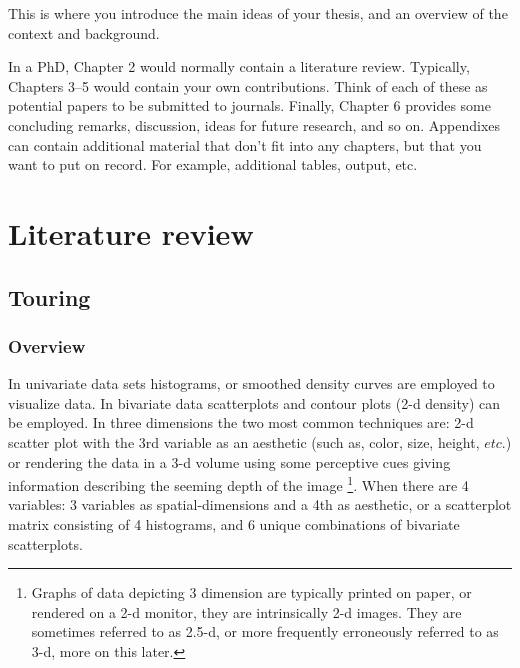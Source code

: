\documentclass{monashthesis}
\begin{document}
This is where you introduce the main ideas of your thesis, and an
overview of the context and background.

In a PhD, Chapter 2 would normally contain a literature review.
Typically, Chapters 3--5 would contain your own contributions. Think of
each of these as potential papers to be submitted to journals. Finally,
Chapter 6 provides some concluding remarks, discussion, ideas for future
research, and so on. Appendixes can contain additional material that
don't fit into any chapters, but that you want to put on record. For
example, additional tables, output, etc.

\chapter{Literature review}\label{ch:lit_review}

\section{Touring}\label{sec:tour}

\subsection{Overview}\label{overview}

In univariate data sets histograms, or smoothed density curves are
employed to visualize data. In bivariate data scatterplots and contour
plots (2-d density) can be employed. In three dimensions the two most
common techniques are: 2-d scatter plot with the 3rd variable as an
aesthetic (such as, color, size, height, \(etc.\)) or rendering the data
in a 3-d volume using some perceptive cues giving information describing
the seeming depth of the image
\footnote{Graphs of data depicting 3 dimension are typically printed on paper, or rendered on a 2-d monitor, they are intrinsically 2-d images. They are sometimes referred to as 2.5-d, or more frequently erroneously referred to as 3-d, more on this later.}.
When there are 4 variables: 3 variables as spatial-dimensions and a 4th
as aesthetic, or a scatterplot matrix consisting of 4 histograms, and 6
unique combinations of bivariate scatterplots.
\end{document}
